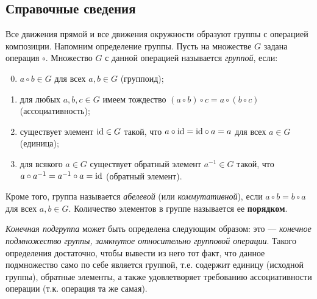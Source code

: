 \subsection*{Справочные сведения}

Все движения прямой и все движения окружности образуют группы с операцией композиции. Напомним определение группы.
Пусть на множестве $G$ задана операция $\circ$. Множество $G$ с данной операцией называется \textit{группой}, если:
\begin{enumerate}
\setcounter{enumi}{-1}
\item $a\circ b\in G$ для всех $a,b\in G$ (группоид);
\item для любых $a,b,c\in G$ имеем тождество $(a\circ b)\circ c=a\circ (b\circ c)$ (ассоциативность);
\item существует элемент $\mathrm{id}\in G$ такой, что $a\circ \mathrm{id}=\mathrm{id}\circ a=a$ для всех $a\in G$ (единица);
\item для всякого $a\in G$ существует обратный элемент $a^{-1}\in G$ такой, что $a\circ a^{-1}=a^{-1}\circ a=\mathrm{id}$ (обратный элемент).
\end{enumerate}

Кроме того, группа называется \textit{абелевой} (или \textit{коммутативной}), если $a\circ b=b\circ a$ для всех $a,b\in G$. Количество элементов в группе называется ее \textbf{порядком}.

\textit{Конечная подгруппа} может быть определена следующим образом: это --- \textit{конечное подмножество группы, замкнутое относительно групповой операции}. Такого определения достаточно, чтобы вывести из него тот факт, что данное подмножество само по себе является группой, т.е. содержит единицу (исходной группы), обратные элементы, а также удовлетворяет требованию ассоциативности операции (т.к. операция та же самая).

